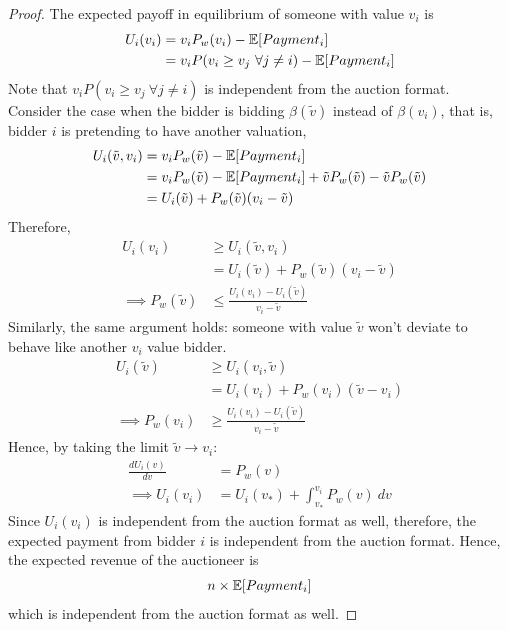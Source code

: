 \documentclass{article}
\begin{document}
	\begin{proof}
		The expected payoff in equilibrium of someone with value $v_i$ is
		\begin{align}
			U_i(v_i) &= v_i P_w(v_i) - \mathbb{E}[{Payment_i}] \\
			&= v_i P(v_i \geq v_j\ \forall j \neq i) - \mathbb{E}[{Payment_i}]
		\end{align}
		Note that $v_i P(v_i \geq v_j\ \forall j \neq i)$ is independent from the auction format. \\
		Consider the case when the bidder is bidding $\beta(\tilde{v})$ instead of $\beta(v_i)$, that is, bidder $i$ is pretending to have another valuation,
		\begin{align}
			U_i(\tilde{v}, v_i) &= v_i P_w(\tilde{v}) - \mathbb{E}[{Payment_i}] \\
			&= v_i P_w(\tilde{v}) - \mathbb{E}[{Payment_i}] + \tilde{v}P_w(\tilde{v}) - \tilde{v}P_w(\tilde{v}) \\
			&= U_i(\tilde{v}) + P_w(\tilde{v})(v_i - \tilde{v})
		\end{align}
		Therefore,
		\begin{align}
			U_i(v_i) &\geq U_i(\tilde{v}, v_i) \\
			&= U_i(\tilde{v}) + P_w(\tilde{v})(v_i - \tilde{v}) \\
			\implies P_w(\tilde{v}) &\leq \frac{U_i(v_i) - U_i(\tilde{v})}{v_i - \tilde{v}}
		\end{align}
		Similarly, the same argument holds: someone with value $\tilde{v}$ won't deviate to behave like another $v_i$ value bidder.
		\begin{align}
			U_i(\tilde{v}) &\geq U_i(v_i, \tilde{v}) \\
			&= U_i(v_i) + P_w(v_i) (\tilde{v} - v_i) \\
			\implies P_w(v_i) &\geq \frac{U_i(v_i)- U_i(\tilde{v})}{v_i - \tilde{v}}
		\end{align}
		Hence, by taking the limit $\tilde{v} \to v_i$:
		\begin{align}
			\frac{dU_i(v)}{dv} &= P_w(v) \\
			\implies U_i(v_i) &= U_i(v_*) + \int_{v_*}^{v_i} P_w(v)\ dv 
		\end{align}
		Since $U_i(v_i)$ is independent from the auction format as well, therefore, the expected payment from bidder $i$ is independent from the auction format. Hence, the expected revenue of the auctioneer is 
		\begin{align}
			n \times \mathbb{E}[{Payment_i}]
		\end{align}
		which is independent from the auction format as well.
	\end{proof}
	
\end{document}
